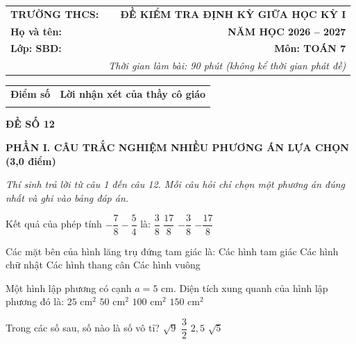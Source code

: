\documentclass[12pt,a4paper]{article}
\begin{document}
\noindent
\begin{tabularx}{\linewidth}{X r}
\textbf{TRƯỜNG THCS: \dotfill} & \textbf{ĐỀ KIỂM TRA ĐỊNH KỲ GIỮA HỌC KỲ I} \\
\textbf{Họ và tên: \dotfill} & \textbf{NĂM HỌC 2026 -- 2027} \\
\textbf{Lớp: \dotfill \quad SBD: \dotfill} & \textbf{Môn: TOÁN 7} \\
& \textit{Thời gian làm bài: 90 phút (không kể thời gian phát đề)}
\end{tabularx}

\vspace{1mm}
\noindent
\begin{tabularx}{\linewidth}{|p{3.5cm}|X|}
\hline
\centering\textbf{Điểm số} & \centering\textbf{Lời nhận xét của thầy cô giáo} \tabularnewline
\rule{0pt}{0.8cm} & \\
\hline
\end{tabularx}

\vspace{1.5mm}
\begin{center}
\textbf{\large ĐỀ SỐ 12}
\end{center}

\noindent\textbf{\large PHẦN I. CÂU TRẮC NGHIỆM NHIỀU PHƯƠNG ÁN LỰA CHỌN (3,0 điểm)}

\textit{Thí sinh trả lời từ câu 1 đến câu 12. Mỗi câu hỏi chỉ chọn một phương án đúng nhất và ghi vào bảng đáp án.}

\vspace{1mm}
\begin{ex}
Kết quả của phép tính $-\dfrac{7}{8} - \dfrac{5}{4}$ là:
\choice
{$\dfrac{3}{8}$}
{$\dfrac{17}{8}$}
{$-\dfrac{3}{8}$}
{\True $-\dfrac{17}{8}$}
\end{ex}

\begin{ex}
Các mặt bên của hình lăng trụ đứng tam giác là:
\choice
{Các hình tam giác}
{\True Các hình chữ nhật}
{Các hình thang cân}
{Các hình vuông}
\end{ex}

\begin{ex}
Một hình lập phương có cạnh $a = 5\text{ cm}$. Diện tích xung quanh của hình lập phương đó là:
\choice
{$25\text{ cm}^2$}
{$50\text{ cm}^2$}
{\True $100\text{ cm}^2$}
{$150\text{ cm}^2$}
\end{ex}

\begin{ex}
Trong các số sau, số nào là số vô tỉ?
\choice
{$\sqrt{9}$}
{$\dfrac{3}{2}$}
{$2{,}5$}
{\True $\sqrt{5}$}
\end{ex}
\end{document}
